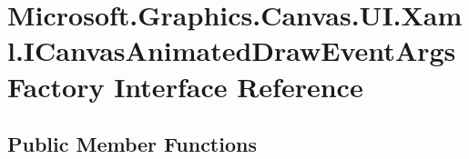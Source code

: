 \hypertarget{interface_microsoft_1_1_graphics_1_1_canvas_1_1_u_i_1_1_xaml_1_1_i_canvas_animated_draw_event_args_factory}{}\section{Microsoft.\+Graphics.\+Canvas.\+U\+I.\+Xaml.\+I\+Canvas\+Animated\+Draw\+Event\+Args\+Factory Interface Reference}
\label{interface_microsoft_1_1_graphics_1_1_canvas_1_1_u_i_1_1_xaml_1_1_i_canvas_animated_draw_event_args_factory}
\subsection*{Public Member Functions}
